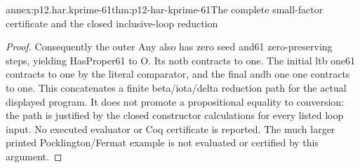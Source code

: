 \begin{annexitem}{annex:p12.har.kprime-61}{thm:p12-har-kprime-61}{The complete small-factor certificate and the closed inclusive-loop reduction}
\begin{proof}
Consequently the outer Any also has zero seed and61 zero-preserving
steps, yielding HasProper61 to O. Its notb contracts to one.
The initial ltb one61 contracts to one by the literal comparator,
and the final andb one one contracts to one. This concatenates a
finite beta/iota/delta reduction path for the actual displayed program.
It does not promote a propositional equality to conversion: the
path is justified by the closed constructor calculations for every
listed loop input. No executed evaluator or Coq certificate is reported.
The much larger printed Pocklington/Fermat example is not evaluated
or certified by this argument.
\end{proof}
\end{annexitem}
